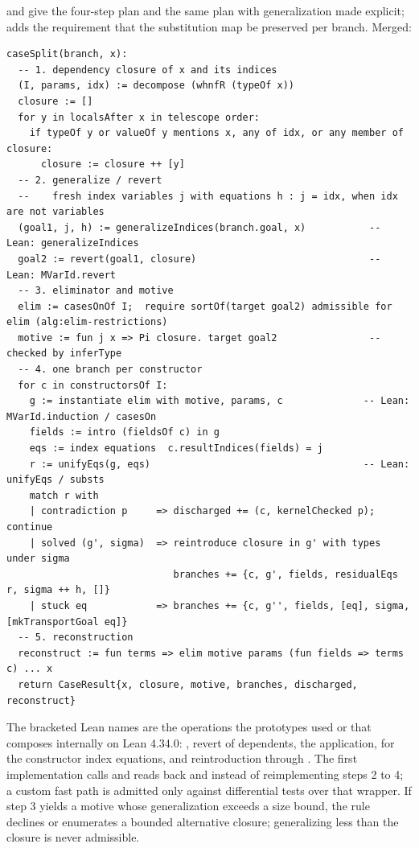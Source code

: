  and  give the four-step plan and  the same plan with generalization made explicit;  adds the requirement that the substitution map be preserved per branch. Merged:

\begin{lstlisting}
caseSplit(branch, x):
  -- 1. dependency closure of x and its indices
  (I, params, idx) := decompose (whnfR (typeOf x))
  closure := []
  for y in localsAfter x in telescope order:
    if typeOf y or valueOf y mentions x, any of idx, or any member of closure:
      closure := closure ++ [y]
  -- 2. generalize / revert
  --    fresh index variables j with equations h : j = idx, when idx are not variables
  (goal1, j, h) := generalizeIndices(branch.goal, x)           -- Lean: generalizeIndices
  goal2 := revert(goal1, closure)                              -- Lean: MVarId.revert
  -- 3. eliminator and motive
  elim := casesOnOf I;  require sortOf(target goal2) admissible for elim (alg:elim-restrictions)
  motive := fun j x => Pi closure. target goal2                -- checked by inferType
  -- 4. one branch per constructor
  for c in constructorsOf I:
    g := instantiate elim with motive, params, c              -- Lean: MVarId.induction / casesOn
    fields := intro (fieldsOf c) in g
    eqs := index equations  c.resultIndices(fields) = j
    r := unifyEqs(g, eqs)                                     -- Lean: unifyEqs / substs
    match r with
    | contradiction p     => discharged += (c, kernelChecked p); continue
    | solved (g', sigma)  => reintroduce closure in g' with types under sigma
                             branches += {c, g', fields, residualEqs r, sigma ++ h, []}
    | stuck eq            => branches += {c, g'', fields, [eq], sigma, [mkTransportGoal eq]}
  -- 5. reconstruction
  reconstruct := fun terms => elim motive params (fun fields => terms c) ... x
  return CaseResult{x, closure, motive, branches, discharged, reconstruct}
\end{lstlisting}

The bracketed Lean names are the operations the prototypes used or that  composes internally on Lean 4.34.0: , revert of dependents, the  application,  for the constructor index equations, and reintroduction through . The first implementation calls  and reads back  and  instead of reimplementing steps 2 to 4; a custom fast path is admitted only against differential tests over that wrapper. If step 3 yields a motive whose generalization exceeds a size bound, the rule declines or enumerates a bounded alternative closure; generalizing less than the closure is never admissible.

